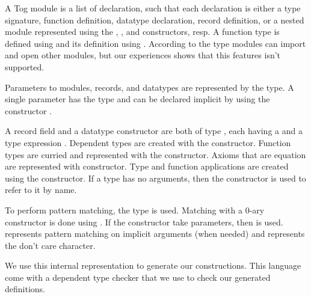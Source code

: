 A Tog module is a list of declaration, such that each declaration is either a type signature, function definition, datatype declaration, record definition, or a nested module represented using the , , and  constructors, resp. 
A function type is defined using  and its definition using . 
According to the type  modules can import and open other modules, but our experiences shows that this features isn't supported. 

Parameters to modules, records, and datatypes are represented by the  type. A single parameter has the type  and can be declared implicit by using the constructor . 

A record field and a datatype constructor are both of type , each having a  and a type expression . Dependent types are created with the  constructor. Function types are curried and represented with the  constructor. Axioms that are equation are represented with  constructor. Type and function applications are created using the  constructor. If a type has no arguments, then the  constructor is used to refer to it by name. 

To perform pattern matching, the  type is used. Matching with a $0$-ary constructor is done using . If the constructor take parameters, then  is used.  represents pattern matching on implicit arguments (when needed) and  represents the don't care \lstmath{$\_$} character. 

We use this internal representation to generate our constructions. This language come with a dependent type checker that we use to check our generated definitions. 

